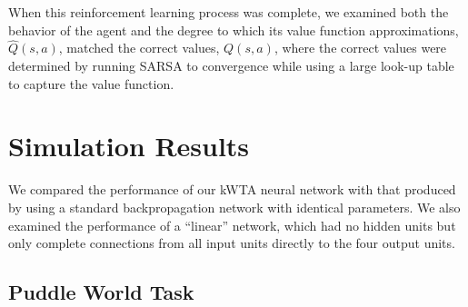 \documentclass[preprint,12pt,authoryear]{elsarticle}
\begin{document}
When this reinforcement learning process was complete, we examined
both the behavior of the agent and the degree to which its value
function approximations, $\hat{Q}(s,a)$, matched the correct values,
$Q(s,a)$, where the correct values were determined by running SARSA
to convergence while using a large look-up table to capture the value
function.







\section{Simulation Results} %
\label{sec:simulation_results}

We compared the performance of our kWTA neural network with that
produced by using a standard backpropagation network with identical
parameters. We also examined the performance of a ``linear'' network,
which had no hidden units but only complete connections from all input
units directly to the four output units.


\subsection{Puddle World Task}
\label{sub:puddle_world_results}
\end{document}
